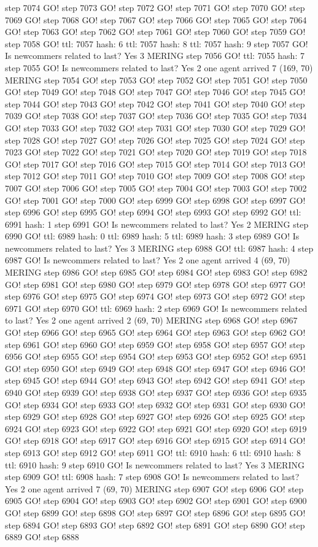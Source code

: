 step 7074 GO! step 7073 GO! step 7072 GO! step 7071 GO! step 7070 GO! step 7069 GO! step 7068 GO! step 7067 GO! step 7066 GO! step 7065 GO! step 7064 GO! step 7063 GO! step 7062 GO! step 7061 GO! step 7060 GO! step 7059 GO! step 7058 GO! ttl: 7057 hash: 6 ttl: 7057 hash: 8 ttl: 7057 hash: 9 step 7057 GO! Is newcommers related to last? Yes 3 MERING step 7056 GO! ttl: 7055 hash: 7 step 7055 GO! Is newcommers related to last? Yes 2 one agent arrived 7 (169, 70) MERING step 7054 GO! step 7053 GO! step 7052 GO! step 7051 GO! step 7050 GO! step 7049 GO! step 7048 GO! step 7047 GO! step 7046 GO! step 7045 GO! step 7044 GO! step 7043 GO! step 7042 GO! step 7041 GO! step 7040 GO! step 7039 GO! step 7038 GO! step 7037 GO! step 7036 GO! step 7035 GO! step 7034 GO! step 7033 GO! step 7032 GO! step 7031 GO! step 7030 GO! step 7029 GO! step 7028 GO! step 7027 GO! step 7026 GO! step 7025 GO! step 7024 GO! step 7023 GO! step 7022 GO! step 7021 GO! step 7020 GO! step 7019 GO! step 7018 GO! step 7017 GO! step 7016 GO! step 7015 GO! step 7014 GO! step 7013 GO! step 7012 GO! step 7011 GO! step 7010 GO! step 7009 GO! step 7008 GO! step 7007 GO! step 7006 GO! step 7005 GO! step 7004 GO! step 7003 GO! step 7002 GO! step 7001 GO! step 7000 GO! step 6999 GO! step 6998 GO! step 6997 GO! step 6996 GO! step 6995 GO! step 6994 GO! step 6993 GO! step 6992 GO! ttl: 6991 hash: 1 step 6991 GO! Is newcommers related to last? Yes 2 MERING step 6990 GO! ttl: 6989 hash: 0 ttl: 6989 hash: 5 ttl: 6989 hash: 3 step 6989 GO! Is newcommers related to last? Yes 3 MERING step 6988 GO! ttl: 6987 hash: 4 step 6987 GO! Is newcommers related to last? Yes 2 one agent arrived 4 (69, 70) MERING step 6986 GO! step 6985 GO! step 6984 GO! step 6983 GO! step 6982 GO! step 6981 GO! step 6980 GO! step 6979 GO! step 6978 GO! step 6977 GO! step 6976 GO! step 6975 GO! step 6974 GO! step 6973 GO! step 6972 GO! step 6971 GO! step 6970 GO! ttl: 6969 hash: 2 step 6969 GO! Is newcommers related to last? Yes 2 one agent arrived 2 (69, 70) MERING step 6968 GO! step 6967 GO! step 6966 GO! step 6965 GO! step 6964 GO! step 6963 GO! step 6962 GO! step 6961 GO! step 6960 GO! step 6959 GO! step 6958 GO! step 6957 GO! step 6956 GO! step 6955 GO! step 6954 GO! step 6953 GO! step 6952 GO! step 6951 GO! step 6950 GO! step 6949 GO! step 6948 GO! step 6947 GO! step 6946 GO! step 6945 GO! step 6944 GO! step 6943 GO! step 6942 GO! step 6941 GO! step 6940 GO! step 6939 GO! step 6938 GO! step 6937 GO! step 6936 GO! step 6935 GO! step 6934 GO! step 6933 GO! step 6932 GO! step 6931 GO! step 6930 GO! step 6929 GO! step 6928 GO! step 6927 GO! step 6926 GO! step 6925 GO! step 6924 GO! step 6923 GO! step 6922 GO! step 6921 GO! step 6920 GO! step 6919 GO! step 6918 GO! step 6917 GO! step 6916 GO! step 6915 GO! step 6914 GO! step 6913 GO! step 6912 GO! step 6911 GO! ttl: 6910 hash: 6 ttl: 6910 hash: 8 ttl: 6910 hash: 9 step 6910 GO! Is newcommers related to last? Yes 3 MERING step 6909 GO! ttl: 6908 hash: 7 step 6908 GO! Is newcommers related to last? Yes 2 one agent arrived 7 (69, 70) MERING step 6907 GO! step 6906 GO! step 6905 GO! step 6904 GO! step 6903 GO! step 6902 GO! step 6901 GO! step 6900 GO! step 6899 GO! step 6898 GO! step 6897 GO! step 6896 GO! step 6895 GO! step 6894 GO! step 6893 GO! step 6892 GO! step 6891 GO! step 6890 GO! step 6889 GO! step 6888 